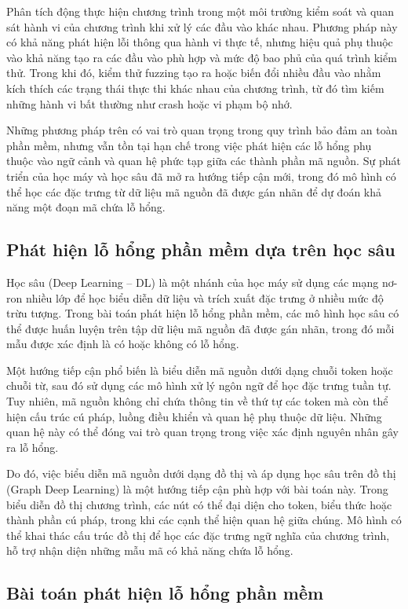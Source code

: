Phân tích động thực hiện chương trình trong một môi trường kiểm soát và quan sát hành vi của chương
trình khi xử lý các đầu vào khác nhau. Phương pháp này có khả năng phát hiện lỗi thông qua hành vi
thực tế, nhưng hiệu quả phụ thuộc vào khả năng tạo ra các đầu vào phù hợp và mức độ bao phủ của quá
trình kiểm thử. Trong khi đó, kiểm thử fuzzing tạo ra hoặc biến đổi nhiều đầu vào nhằm kích thích
các trạng thái thực thi khác nhau của chương trình, từ đó tìm kiếm những hành vi bất thường như
crash hoặc vi phạm bộ nhớ.

Những phương pháp trên có vai trò quan trọng trong quy trình bảo đảm an toàn phần mềm, nhưng vẫn
tồn tại hạn chế trong việc phát hiện các lỗ hổng phụ thuộc vào ngữ cảnh và quan hệ phức tạp giữa
các thành phần mã nguồn. Sự phát triển của học máy và học sâu đã mở ra hướng tiếp cận mới, trong đó
mô hình có thể học các đặc trưng từ dữ liệu mã nguồn đã được gán nhãn để dự đoán khả năng một đoạn
mã chứa lỗ hổng.

\subsection{Phát hiện lỗ hổng phần mềm dựa trên học sâu}

Học sâu (Deep Learning -- DL) là một nhánh của học máy sử dụng các mạng nơ-ron nhiều lớp để học
biểu diễn dữ liệu và trích xuất đặc trưng ở nhiều mức độ trừu tượng. Trong bài toán phát hiện lỗ
hổng phần mềm, các mô hình học sâu có thể được huấn luyện trên tập dữ liệu mã nguồn đã được gán
nhãn, trong đó mỗi mẫu được xác định là có hoặc không có lỗ hổng.

Một hướng tiếp cận phổ biến là biểu diễn mã nguồn dưới dạng chuỗi token hoặc chuỗi từ, sau đó sử
dụng các mô hình xử lý ngôn ngữ để học đặc trưng tuần tự. Tuy nhiên, mã nguồn không chỉ chứa thông
tin về thứ tự các token mà còn thể hiện cấu trúc cú pháp, luồng điều khiển và quan hệ phụ thuộc dữ
liệu. Những quan hệ này có thể đóng vai trò quan trọng trong việc xác định nguyên nhân gây ra lỗ
hổng.

Do đó, việc biểu diễn mã nguồn dưới dạng đồ thị và áp dụng học sâu trên đồ thị (Graph Deep
Learning) là một hướng tiếp cận phù hợp với bài toán này. Trong biểu diễn đồ thị chương trình, các
nút có thể đại diện cho token, biểu thức hoặc thành phần cú pháp, trong khi các cạnh thể hiện quan
hệ giữa chúng. Mô hình có thể khai thác cấu trúc đồ thị để học các đặc trưng ngữ nghĩa của chương
trình, hỗ trợ nhận diện những mẫu mã có khả năng chứa lỗ hổng.

\subsection{Bài toán phát hiện lỗ hổng phần mềm}

